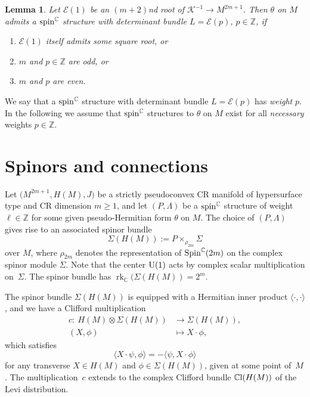 \documentclass[10pt,a4paper]{amsart}
\numberwithin{equation}{section}
\newtheorem{Lemma}[Theorem]{Lemma}
\newcommand{\ZZ}{\mathbb{Z}}
\newcommand{\CC}{\mathbb{C}}
\begin{document}
\begin{Lemma} Let $\mathcal{E}(1)$ be an $(m+2)$nd root of $\mathcal{K}^{-1}\to M^{2m+1}$. Then $\theta$ on $M$ admits a ${\rm spin}^\CC$ structure
with determinant bundle $L=\mathcal{E}(p)$, $p\in\ZZ$, if
\begin{enumerate}\itemsep=0pt
\item[$(i)$] $\mathcal{E}(1)$ itself admits some square root, or
\item[$(ii)$] $m$ and $p\in\ZZ$ are odd, or
\item[$(iii)$] $m$ and $p$ are even.
\end{enumerate}
\end{Lemma}

We say that a ${\rm spin}^\CC$ structure with determinant bundle $L=\mathcal{E}(p)$ has {\em weight} $p$.
In the following we assume that ${\rm spin}^\CC$ structures to $\theta$ on $M$ exist for all {\em necessary} weights $p\in\ZZ$.

\section{Spinors and connections} \label{Sec5}

Let $\big(M^{2m+1},H(M),J\big)$ be a strictly pseudoconvex CR manifold of hypersurface type and CR dimension $m\geq 1$,
and let $(P,\Lambda)$ be a ${\rm spin}^\CC$ structure of weight $\ell\in\ZZ$ for some given pseudo-Hermitian form $\theta$ on $M$.
The choice of $(P,\Lambda)$ gives rise to an
associated spinor bundle
\[ \Sigma(H(M)) := P\times_{\rho_{2m}}\Sigma\]
over $M$, where $\rho_{2m}$ denotes the representation of ${\rm Spin}^\CC(2m)$ on the complex spinor module $\Sigma$.
Note that the center ${\rm U}(1)$ acts by complex scalar multiplication on~$\Sigma$.
The spinor bundle has $\operatorname{rk}_\CC(\Sigma(H(M))=2^m$.

The spinor bundle $\Sigma(H(M))$ is equipped with a Hermitian inner product $\langle\cdot,\cdot\rangle$, and we have a Clifford multiplication
\begin{align*}
c \colon \ H(M) \otimes \Sigma(H(M)) &\to \Sigma(H(M)),\\
 (X,\phi) &\mapsto X\cdot \phi,
\end{align*}
which satisfies
\[
\langle X\cdot \psi,\phi\rangle = -\langle \psi,X\cdot \phi\rangle
\]
for any transverse $X\in H(M)$ and $\phi\in\Sigma(H(M))$, given at some point of~$M$.
The multiplica\-tion~$c$ extends to the complex Clifford bundle $\CC{\rm l}(H(M))$ of the Levi distribution.
\end{document}
